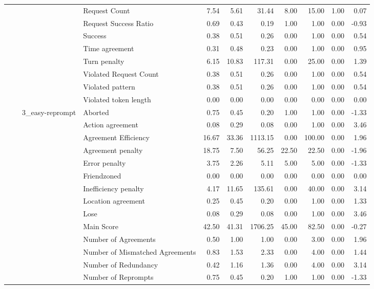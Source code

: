 \begin{tabular}{llllrrrrrrr}
 &  &  & Request Count & 7.54 & 5.61 & 31.44 & 8.00 & 15.00 & 1.00 & 0.07 \\
 &  &  & Request Success Ratio & 0.69 & 0.43 & 0.19 & 1.00 & 1.00 & 0.00 & -0.93 \\
 &  &  & Success & 0.38 & 0.51 & 0.26 & 0.00 & 1.00 & 0.00 & 0.54 \\
 &  &  & Time agreement & 0.31 & 0.48 & 0.23 & 0.00 & 1.00 & 0.00 & 0.95 \\
 &  &  & Turn penalty & 6.15 & 10.83 & 117.31 & 0.00 & 25.00 & 0.00 & 1.39 \\
 &  &  & Violated Request Count & 0.38 & 0.51 & 0.26 & 0.00 & 1.00 & 0.00 & 0.54 \\
 &  &  & Violated pattern & 0.38 & 0.51 & 0.26 & 0.00 & 1.00 & 0.00 & 0.54 \\
 &  &  & Violated token length & 0.00 & 0.00 & 0.00 & 0.00 & 0.00 & 0.00 & 0.00 \\
\cline{3-11}
 &  & \multirow[t]{27}{*}{3_easy-reprompt} & Aborted & 0.75 & 0.45 & 0.20 & 1.00 & 1.00 & 0.00 & -1.33 \\
 &  &  & Action agreement & 0.08 & 0.29 & 0.08 & 0.00 & 1.00 & 0.00 & 3.46 \\
 &  &  & Agreement Efficiency & 16.67 & 33.36 & 1113.15 & 0.00 & 100.00 & 0.00 & 1.96 \\
 &  &  & Agreement penalty & 18.75 & 7.50 & 56.25 & 22.50 & 22.50 & 0.00 & -1.96 \\
 &  &  & Error penalty & 3.75 & 2.26 & 5.11 & 5.00 & 5.00 & 0.00 & -1.33 \\
 &  &  & Friendzoned & 0.00 & 0.00 & 0.00 & 0.00 & 0.00 & 0.00 & 0.00 \\
 &  &  & Inefficiency penalty & 4.17 & 11.65 & 135.61 & 0.00 & 40.00 & 0.00 & 3.14 \\
 &  &  & Location agreement & 0.25 & 0.45 & 0.20 & 0.00 & 1.00 & 0.00 & 1.33 \\
 &  &  & Lose & 0.08 & 0.29 & 0.08 & 0.00 & 1.00 & 0.00 & 3.46 \\
 &  &  & Main Score & 42.50 & 41.31 & 1706.25 & 45.00 & 82.50 & 0.00 & -0.27 \\
 &  &  & Number of Agreements & 0.50 & 1.00 & 1.00 & 0.00 & 3.00 & 0.00 & 1.96 \\
 &  &  & Number of Mismatched Agreements & 0.83 & 1.53 & 2.33 & 0.00 & 4.00 & 0.00 & 1.44 \\
 &  &  & Number of Redundancy & 0.42 & 1.16 & 1.36 & 0.00 & 4.00 & 0.00 & 3.14 \\
 &  &  & Number of Reprompts & 0.75 & 0.45 & 0.20 & 1.00 & 1.00 & 0.00 & -1.33 \\

\end{tabular}
